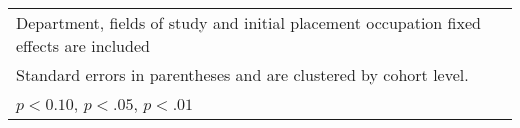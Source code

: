 \begin{table}[ht]
{\begin{tabular}{l*{6}{c}}
\hline\hline
\multicolumn{7}{l}{\footnotesize Department, fields of study and initial placement occupation fixed effects are included}\\
\multicolumn{7}{l}{\footnotesize Standard errors in parentheses and are clustered by cohort level.}\\
\multicolumn{7}{l}{\footnotesize \sym{*} \(p<0.10\), \sym{**} \(p<.05\), \sym{***} \(p<.01\)}\\
\end{tabular}%
}
\end{table}